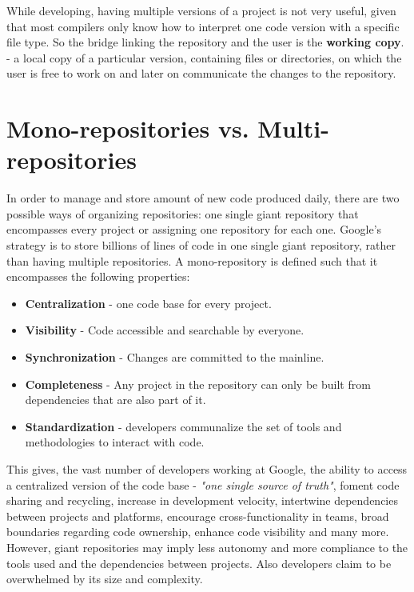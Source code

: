 While developing, having multiple versions of a project is not very useful, given that most compilers only know how to interpret one code version with a specific file type. So the bridge linking the repository and the user is the \textbf{working copy}. - a local copy of a particular version, containing files or directories, on which the user is free to work on and later on communicate the changes to the repository.\cite{santolucito2018statically}


\section{Mono-repositories vs. Multi-repositories}

In order to manage and store amount of new code produced daily, there are two possible ways of organizing repositories: one single giant repository that encompasses every project or assigning one repository for each one. Google's strategy is to store billions of lines of code in one single giant repository, rather than having multiple repositories. \cite{Potvin:2016:WGS:2963119.2854146}
A mono-repository is defined such that it encompasses the following properties: 
\begin{itemize}
	\item \textbf{Centralization} - one code base for every project.
	\item \textbf{Visibility} - Code accessible and searchable by everyone.
	\item \textbf{Synchronization} - Changes are committed  to the mainline.
	\item \textbf{Completeness} - Any project in the repository can only be built from dependencies that are also part of it. 
	\item \textbf{Standardization} - developers communalize the set of tools and methodologies to interact with code.
\end{itemize}

This gives, the vast number of developers working at Google, the ability to access a centralized version of the code base - \textit{"one single source of truth"}, foment code sharing and recycling, increase in development velocity,  intertwine dependencies between projects and platforms, encourage cross-functionality in teams, broad boundaries regarding code ownership, enhance code visibility and many more. However, giant repositories may imply less autonomy and more compliance to the tools used and the dependencies between projects. Also developers claim to be overwhelmed by its size and complexity.

